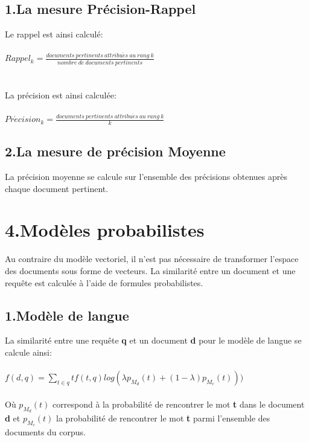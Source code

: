 \documentclass[a4paper,11pt]{report}
\begin{document}
\subsection*{1.La mesure Précision-Rappel}
Le rappel est ainsi calculé:\\\\
$Rappel_k = \frac{documents~pertinents~attribu\acute{e}s~au~rang~k}{nombre~de~documents~pertinents}$\\\\\\

La précision est ainsi calculée:\\\\
$Pr\acute{e}cision_k = \frac{documents~pertinents~attribu\acute{e}s~au~rang~k}{k}$ 

\subsection*{2.La mesure de précision Moyenne}

La précision moyenne se calcule sur l'ensemble des précisions obtenues après chaque document pertinent. 






\section*{4.Modèles probabilistes}

Au contraire du modèle vectoriel, il n'est pas nécessaire de transformer l'espace des documents sous forme de vecteurs. La similarité entre un document et une requête est calculée à l'aide de formules probabilistes.

\subsection*{1.Modèle de langue}
La similarité entre une requête \textbf{q} et un document \textbf{d} pour le modèle de langue se calcule ainsi:\\\\
 $f(d,q)=\sum_{t \in q } tf(t,q) log( \lambda p_{M_d} (t)+(1- \lambda )p_{M_c} (t)))$\\\\ Où  $p_{M_d}(t)$ correspond à la probabilité de rencontrer le mot \textbf{t}  dans le document \textbf{d} et  $p_{M_c}(t)$ la probabilité de rencontrer le mot \textbf{t} parmi l'ensemble des documents du corpus.
 
\end{document}
